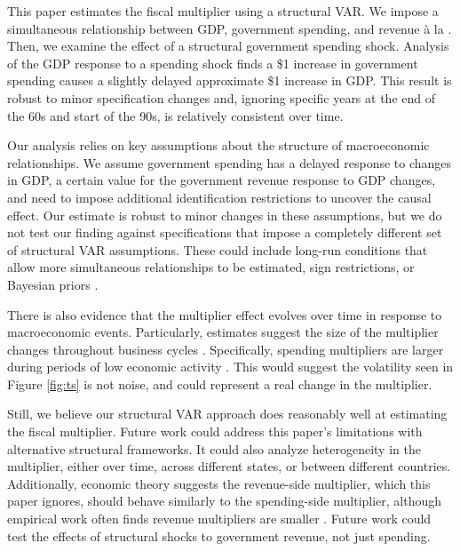 This paper estimates the fiscal multiplier using a structural VAR. We impose a simultaneous relationship between GDP, government spending, and revenue à la \textcite{blanchard2002empirical}. Then, we examine the effect of a structural government spending shock. Analysis of the GDP response to a spending shock finds a \$1 increase in government spending causes a slightly delayed approximate \$1 increase in GDP. This result is robust to minor specification changes and, ignoring specific years at the end of the 60s and start of the 90s, is relatively consistent over time.

Our analysis relies on key assumptions about the structure of macroeconomic relationships. We assume government spending has a delayed response to changes in GDP, a certain value for the government revenue response to GDP changes, and need to impose additional identification restrictions to uncover the causal effect. Our estimate is robust to minor changes in these assumptions, but we do not test our finding against specifications that impose a completely different set of structural VAR assumptions. These could include long-run conditions that allow more simultaneous relationships to be estimated, sign restrictions, or Bayesian priors \parencites{mountford2009effects}{afonso2019fiscal}.

There is also evidence that the multiplier effect evolves over time in response to macroeconomic events. Particularly, estimates suggest the size of the multiplier changes throughout business cycles \parencites{baum2012fiscal}{albonico2021public}. Specifically, spending multipliers are larger during periods of low economic activity \parencite{arin2015fiscal}. This would suggest the volatility seen in Figure \ref{fig:ts} is not noise, and could represent a real change in the multiplier.

Still, we believe our structural VAR approach does reasonably well at estimating the fiscal multiplier. Future work could address this paper's limitations with alternative structural frameworks. It could also analyze heterogeneity in the multiplier, either over time, across different states, or between different countries. Additionally, economic theory suggests the revenue-side multiplier, which this paper ignores, should behave similarly to the spending-side multiplier, although empirical work often finds revenue multipliers are smaller \parencite{mineshima2014size}. Future work could test the effects of structural shocks to government revenue, not just spending.
